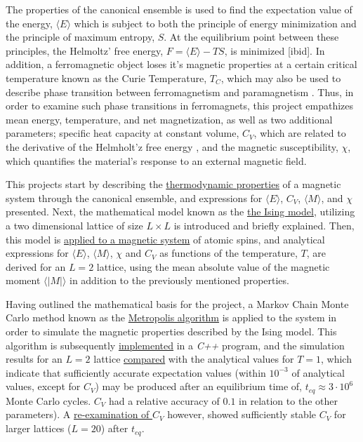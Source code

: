 \documentclass[%
oneside,                 %
final,                   %
10pt]{article}
\begin{document}
The properties of the canonical ensemble is used to find the expectation value of the energy, $\langle E \rangle$ which is subject to both the principle of energy minimization and the principle of maximum entropy, $S$. At the equilibrium point between these principles, the Helmoltz' free energy, $F=\langle E \rangle-TS$, is minimized [ibid]. In addition, a ferromagnetic object loses it's magnetic properties at a certain critical temperature known as the Curie Temperature, $T_C$, which may also be used to describe phase transition between ferromagnetism and paramagnetism \cite{FeynmanFM}. Thus, in order to examine such phase transitions in ferromagnets, this project empathizes mean energy, temperature, and net magnetization, as well as two additional parameters; specific heat capacity at constant volume, $C_V$, which are related to the derivative of the Helmholt'z free energy \cite{HJ-SP}, and the magnetic susceptibility, $\chi$, which quantifies the material's response to an external magnetic field. \newline


This projects start by describing the \hyperref[SS:thermodynamic.properties]{thermodynamic properties} of a magnetic system through the canonical ensemble, and expressions for $\langle E \rangle $, $C_V$, $\langle M \rangle $, and $\chi$ presented. Next, the mathematical model known as the \hyperref[SS:Ising]{the Ising model}, utilizing a two dimensional lattice of size $L \times L$ is introduced and briefly explained. Then, this model is \hyperref[SS:M.Model_application]{applied to a magnetic system} of atomic spins, and analytical expressions for $\langle E \rangle$, $\langle M \rangle$, $\chi$ and $C_V$ as functions of the temperature, $T$, are derived for an $L=2$ lattice, using the mean absolute value of the magnetic moment  $\langle |M| \rangle$ in addition to the previously mentioned properties.  \newline

Having outlined the mathematical basis for the project, a Markov Chain Monte Carlo method known as the \hyperref[SS:MCMCmethod]{Metropolis algorithm} is  applied to the system in order to simulate the magnetic properties described by the Ising model. This algorithm is subsequently \hyperref[SS:init.algo.impl]{implemented} in a \textit{C++} program, and the simulation results for an $L=2$ lattice \hyperref[SS:R.initialeval]{compared} with the analytical values for $T=1$, which indicate that sufficiently accurate expectation values (within $10^{-3}$ of analytical values, except for $C_V$) may be produced after an equilibrium time of, $t_{eq} \approx 3 \cdot 10^6$ Monte Carlo cycles. $C_V$ had a relative accuracy of $0.1$ in relation to the other parameters). A \hyperref[SS:M.Eq.time]{re-examination of $C_V$} however, showed sufficiently stable $C_V$ for larger lattices ($L=20$) after $t_{eq}$. \newline
\end{document}

